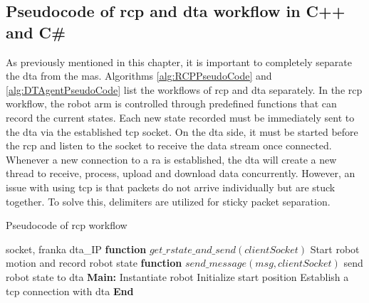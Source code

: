 \subsection{Pseudocode of \gls{rcp} and \gls{dta} workflow in C++ and C\#}\label{chap: RCPDTAPseudo}

As previously mentioned in this chapter, it is important to completely separate the 
\gls{dta} from the \gls{mas}. Algorithms \ref{alg:RCPPseudoCode} and 
\ref{alg:DTAgentPseudoCode} list the workflows of \gls{rcp} and \gls{dta} separately. 
In the \gls{rcp} workflow, the robot arm is controlled through predefined functions 
that can record the current states. Each new state recorded must be immediately sent 
to the \gls{dta} via the established \gls{tcp} socket. 
On the \gls{dta} side, it must be started before the \gls{rcp} and listen to the 
socket to receive the data stream once connected. Whenever a new connection to a 
\gls{ra} is established, the \gls{dta} will create a new thread to receive, process, 
upload and download data concurrently. 
However, an issue with using \gls{tcp} is that packets do not arrive individually 
but are stuck together. To solve this, delimiters are utilized for sticky packet separation.

\begin{breakablealgorithm}
    \caption{Pseudocode of \gls{rcp} workflow}
    \label{alg:RCPPseudoCode}
    \begin{algorithmic}
     socket, franka
     \gls{dta}\_IP
    \State \textbf{function} {$get\_rstate\_and\_send(clientSocket)$}
        \State \qquad Start robot motion and record robot state
        \State {}
    \State \textbf{function} {$send\_message(msg, clientSocket)$}
        \State \qquad send robot state to \gls{dta} 
    \State \textbf{Main:}
    \State \qquad Instantiate robot
    \State \qquad Initialize start position
    \State \qquad Establish a \gls{tcp} connection with \gls{dta}  
    \State {}
    \State \textbf{End}
    \end{algorithmic}
\end{breakablealgorithm}


